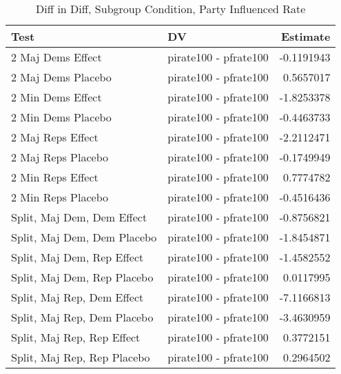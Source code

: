 \documentclass[12pt]{article}
\begin{document}
\begin{table}[H]
	\centering
	\caption{Diff in Diff, Subgroup Condition, Party Influenced Rate} 
	\begin{tabular}{llr}
		\hline
		Test & DV & Estimate \\ 
		\hline
		2 Maj Dems Effect & pirate100 - pfrate100 & -0.1191943 \\ 
		2 Maj Dems Placebo & pirate100 - pfrate100 & 0.5657017 \\ 
		2 Min Dems Effect & pirate100 - pfrate100 & -1.8253378 \\ 
		2 Min Dems Placebo & pirate100 - pfrate100 & -0.4463733 \\ 
		2 Maj Reps Effect & pirate100 - pfrate100 & -2.2112471 \\ 
		2 Maj Reps Placebo & pirate100 - pfrate100 & -0.1749949 \\ 
		2 Min Reps Effect & pirate100 - pfrate100 & 0.7774782 \\ 
		2 Min Reps Placebo & pirate100 - pfrate100 & -0.4516436 \\ 
		Split, Maj Dem, Dem Effect & pirate100 - pfrate100 & -0.8756821 \\ 
		Split, Maj Dem, Dem Placebo & pirate100 - pfrate100 & -1.8454871 \\ 
		Split, Maj Dem, Rep Effect & pirate100 - pfrate100 & -1.4582552 \\ 
		Split, Maj Dem, Rep Placebo & pirate100 - pfrate100 & 0.0117995 \\ 
		Split, Maj Rep, Dem Effect & pirate100 - pfrate100 & -7.1166813 \\ 
		Split, Maj Rep, Dem Placebo & pirate100 - pfrate100 & -3.4630959 \\ 
		Split, Maj Rep, Rep Effect & pirate100 - pfrate100 & 0.3772151 \\ 
		Split, Maj Rep, Rep Placebo & pirate100 - pfrate100 & 0.2964502 \\ 
		\hline
	\end{tabular}
\end{table}
\end{document}
